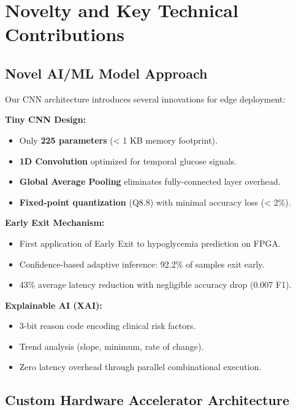 \documentclass[11pt, a4paper]{article}
\begin{document}
\section{Novelty and Key Technical Contributions}

\subsection{Novel AI/ML Model Approach}

Our CNN architecture introduces several innovations for edge deployment:

\textbf{Tiny CNN Design:}
\begin{itemize}
    \item Only \textbf{225 parameters} (< 1 KB memory footprint).
    \item \textbf{1D Convolution} optimized for temporal glucose signals.
    \item \textbf{Global Average Pooling} eliminates fully-connected layer overhead.
    \item \textbf{Fixed-point quantization} (Q8.8) with minimal accuracy loss (< 2\%).
\end{itemize}

\textbf{Early Exit Mechanism:}
\begin{itemize}
    \item First application of Early Exit to hypoglycemia prediction on FPGA.
    \item Confidence-based adaptive inference: 92.2\% of samples exit early.
    \item 43\% average latency reduction with negligible accuracy drop (0.007 F1).
\end{itemize}

\textbf{Explainable AI (XAI):}
\begin{itemize}
    \item 3-bit reason code encoding clinical risk factors.
    \item Trend analysis (slope, minimum, rate of change).
    \item Zero latency overhead through parallel combinational execution.
\end{itemize}

\subsection{Custom Hardware Accelerator Architecture}
\end{document}
